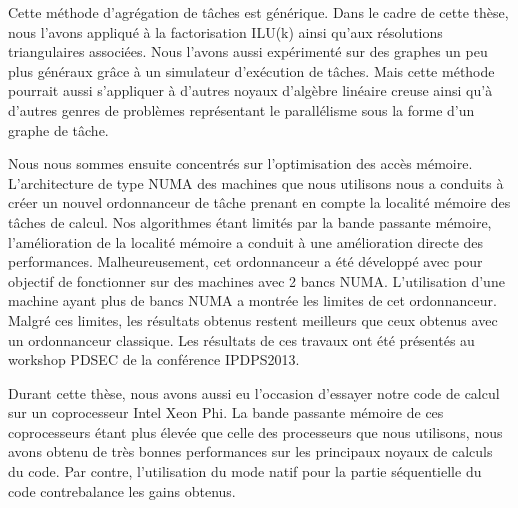 Cette méthode d'agrégation de tâches est générique.
%
Dans le cadre de cette thèse, nous l'avons appliqué à la factorisation ILU(k) ainsi qu'aux résolutions triangulaires associées.
%
Nous l'avons aussi expérimenté sur des graphes un peu plus généraux grâce à un simulateur d'exécution de tâches.
%
Mais cette méthode pourrait aussi s'appliquer à d'autres noyaux d'algèbre linéaire creuse ainsi qu'à d'autres genres de problèmes représentant le parallélisme sous la forme d'un graphe de tâche.



Nous nous sommes ensuite concentrés sur l'optimisation des accès mémoire.
%
L'architecture de type NUMA des machines que nous utilisons nous a conduits à créer un nouvel ordonnanceur de tâche prenant en compte la localité mémoire des tâches de calcul.
%
Nos algorithmes étant limités par la bande passante mémoire, l'amélioration de la localité mémoire a conduit à une amélioration directe des performances.
%
Malheureusement, cet ordonnanceur a été développé avec pour objectif de fonctionner sur des machines avec 2 bancs NUMA.
%
L'utilisation d'une machine ayant plus de bancs NUMA a montrée les limites de cet ordonnanceur.
%
Malgré ces limites, les résultats obtenus restent meilleurs que ceux obtenus avec un ordonnanceur classique.
%
Les résultats de ces travaux ont été présentés au workshop PDSEC de la conférence IPDPS2013.


Durant cette thèse, nous avons aussi eu l'occasion d'essayer notre code de calcul sur un coprocesseur Intel Xeon Phi.
%
La bande passante mémoire de ces coprocesseurs étant plus élevée que celle des processeurs que nous utilisons, nous avons obtenu de très bonnes performances sur les principaux noyaux de calculs du code.
%
Par contre, l'utilisation du mode natif pour la partie séquentielle du code contrebalance les gains obtenus.
